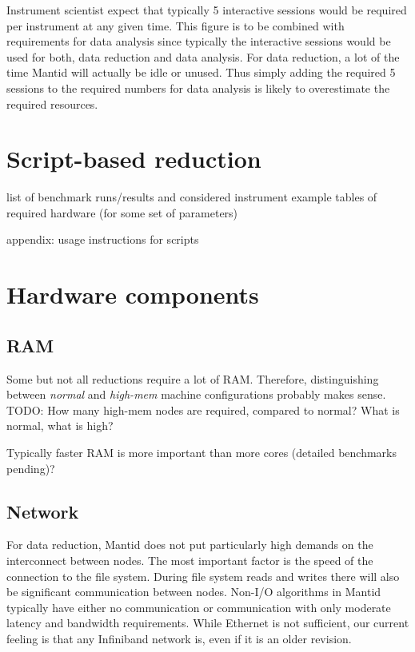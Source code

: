 \documentclass[a4paper,english,numbers=noenddot,bibliography=totoc,chapterprefix=on,DIV=12]{scrartcl}
\begin{document}
Instrument scientist expect that typically 5 interactive sessions would be required per instrument at any given time.
This figure is to be combined with requirements for data analysis since typically the interactive sessions would be used for both, data reduction and data analysis.
For data reduction, a lot of the time Mantid will actually be idle or unused.
Thus simply adding the required 5 sessions to the required numbers for data analysis is likely to overestimate the required resources.

\section{Script-based reduction}

list of benchmark runs/results and considered instrument
example tables of required hardware (for some set of parameters)

appendix: usage instructions for scripts

\section{Hardware components}

\subsection{RAM}

Some but not all reductions require a lot of RAM.
Therefore, distinguishing between \emph{normal} and \emph{high-mem} machine configurations probably makes sense.
TODO: How many high-mem nodes are required, compared to normal? What is normal, what is high?

Typically faster RAM is more important than more cores (detailed benchmarks pending)?

\subsection{Network}

For data reduction, Mantid does not put particularly high demands on the interconnect between nodes.
The most important factor is the speed of the connection to the file system.
During file system reads and writes there will also be significant communication between nodes.
Non-I/O algorithms in Mantid typically have either no communication or communication with only moderate latency and bandwidth requirements.
While Ethernet is not sufficient, our current feeling is that any Infiniband network is, even if it is an older revision.
\end{document}
